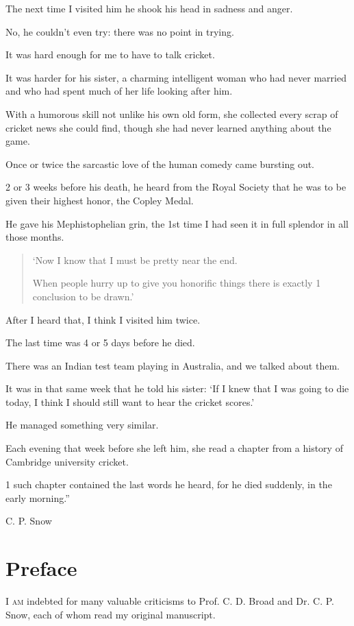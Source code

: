 \documentclass{article}
\numberwithin{equation}{section}
\begin{document}
The next time I visited him he shook his head in sadness and anger.

No, he couldn't even try: there was no point in trying.

%
It was hard enough for me to have to talk cricket.

It was harder for his sister, a charming intelligent woman who had never married and who had spent much of her life looking after him.

With a humorous skill not unlike his own old form, she collected every scrap of cricket news she could find, though she had never learned anything about the game.

%
Once or twice the sarcastic love of the human comedy came bursting out.

2 or 3 weeks before his death, he heard from the Royal Society that he was to be given their highest honor, the Copley Medal.

He gave his Mephistophelian grin, the 1st time I had seen it in full splendor in all those months.
\begin{quotation}
    `Now I know that I must be pretty near the end.
    
    When people hurry up to give you honorific things there is exactly 1 conclusion to be drawn.'
\end{quotation}
After I heard that, I think I visited him twice.

The last time was 4 or 5 days before he died.

There was an Indian test team playing in Australia, and we talked about them.

%
It was in that same week that he told his sister: `If I knew that I was going to die today, I think I should still want to hear the cricket scores.'

%
He managed something very similar.

Each evening that week before she left him, she read a chapter from a history of Cambridge university cricket.

1 such chapter contained the last words he heard, for he died suddenly, in the early morning.''

\begin{flushright}
    C. P. Snow
\end{flushright}


\section*{Preface}
\textsc{I am} indebted for many valuable criticisms to Prof. C. D. Broad and Dr. C. P. Snow, each of whom read my original manuscript.
\end{document}
